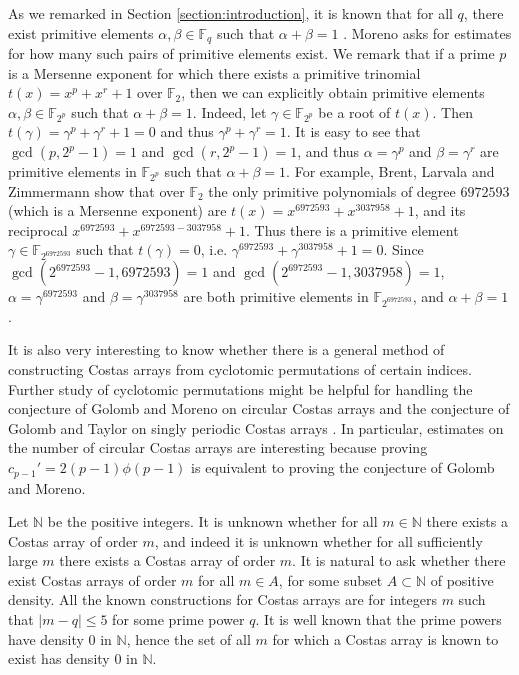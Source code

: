\documentclass[10pt]{amsart}
\begin{document}
As we remarked in Section \ref{section:introduction}, it is known
that for all $q$, there exist primitive elements $\alpha,\beta \in
\mathbb{F}_q$ such that $\alpha+\beta=1$
\cite{MR1209243,moreno1990}. Moreno \cite{MR1992966} asks for estimates
for how many such pairs of primitive elements exist.
We remark that if a prime $p$ is a
Mersenne exponent for which there exists a primitive trinomial
$t(x)=x^p+x^r+1$ over $\mathbb{F}_2$, then we can explicitly
obtain primitive elements $\alpha,\beta \in \mathbb{F}_{2^p}$ such
that $\alpha+\beta=1$. Indeed, let $\gamma \in \mathbb{F}_{2^p}$
be a root of $t(x)$. Then $t(\gamma)= \gamma^p+\gamma^r+1=0$ and
thus $\gamma^p+\gamma^r=1$. It is easy to see that
$\gcd(p,2^p-1)=1$ and $\gcd(r,2^p-1)=1$, and thus
$\alpha=\gamma^p$ and $\beta=\gamma^r$ are primitive elements in
$\mathbb{F}_{2^p}$ such that $\alpha+\beta=1$. For example, Brent,
Larvala and Zimmermann \cite{MR2114660} show that over
$\mathbb{F}_2$ the only primitive polynomials of degree $6972593$
(which is a Mersenne exponent) are
$t(x)=x^{6972593}+x^{3037958}+1$, and its reciprocal
$x^{6972593}+x^{6972593-3037958}+1$. Thus there is a primitive
element $\gamma \in \mathbb{F}_{2^{6972593}}$ such that
$t(\gamma)=0$, i.e. $\gamma^{6972593}+\gamma^{3037958}+1=0$. Since
$\gcd(2^{6972593}-1,6972593)=1$ and
$\gcd(2^{6972593}-1,3037958)=1$, $\alpha=\gamma^{6972593}$ and
$\beta=\gamma^{3037958}$ are both primitive elements in
$\mathbb{F}_{2^{6972593}}$, and
$\alpha+\beta=1$.



It is also very interesting to know whether there is a general
method of constructing Costas arrays  from cyclotomic permutations
of certain indices. Further study of cyclotomic
permutations might be helpful for handling 
the conjecture of Golomb and Moreno on circular Costas arrays
\cite{periodicity} and the conjecture of Golomb and Taylor on singly
periodic Costas arrays \cite{golomb1984}. In particular, estimates
on the number of circular Costas arrays are interesting because
proving $c_{p-1}' = 2(p-1)\phi(p-1)$ is equivalent to proving the
conjecture of Golomb and Moreno.


Let $\mathbb{N}$ be the positive integers.
It is unknown whether for all
$m \in \mathbb{N}$ there exists a Costas array of order $m$, and indeed it is unknown
whether for all sufficiently large $m$ there exists a Costas array of order $m$.
It is natural to ask whether
there exist Costas arrays of order $m$ for all $m \in A$, for some subset
$A \subset \mathbb{N}$ of positive density. All the known constructions
for Costas arrays are for integers $m$ such that $|m-q| \leq 5$ for some
prime power
$q$. It is well known that the prime powers have density 0 in $\mathbb{N}$,
hence the set of all $m$ for which a Costas array is known to exist
has density 0 in $\mathbb{N}$.
\end{document}

